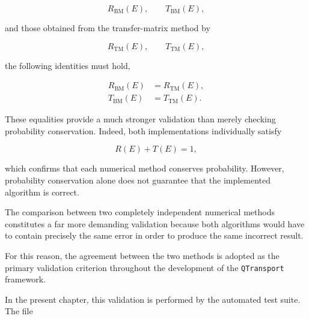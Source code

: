 \[
	R_{\mathrm{BM}}(E),
	\qquad
	T_{\mathrm{BM}}(E),
\]

and those obtained from the transfer-matrix method by

\[
	R_{\mathrm{TM}}(E),
	\qquad
	T_{\mathrm{TM}}(E),
\]

the following identities must hold,

\begin{align}
	R_{\mathrm{BM}}(E)
	&=
	R_{\mathrm{TM}}(E),
	\\
	T_{\mathrm{BM}}(E)
	&=
	T_{\mathrm{TM}}(E).
\end{align}

These equalities provide a much stronger validation than merely checking
probability conservation. Indeed, both implementations individually
satisfy

\[
	R(E)+T(E)=1,
\]

which confirms that each numerical method conserves probability.
However, probability conservation alone does not guarantee that the
implemented algorithm is correct.

The comparison between two completely independent numerical methods
constitutes a far more demanding validation because both algorithms
would have to contain precisely the same error in order to produce the
same incorrect result.

For this reason, the agreement between the two methods is adopted as the
primary validation criterion throughout the development of the
\texttt{QTransport} framework.

\begin{center}
\end{center}

In the present chapter, this validation is performed by the automated
test suite. The file

